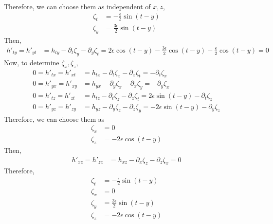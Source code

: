 \documentclass[12pt]{article}
\begin{document}
Therefore, we can choose them as independent of $x, z$,
\begin{align}
\zeta_{t} &= - \frac{\epsilon}{2} \sin\left(t - y\right) \\
\zeta_{y} &= \frac{3 \epsilon}{2} \sin\left(t - y\right)
\end{align}
Then,
\begin{align}
h'_{t y} = h'_{y t} &= h_{ty} - \partial_{t} \zeta_{y} - \partial_{y} \zeta_{t} = 2 \epsilon \cos\left(t - y\right) - \frac{3 \epsilon}{2} \cos\left(t - y\right) - \frac{\epsilon}{2} \cos\left(t - y\right) = 0
\end{align}
Now, to determine $\zeta_{x}, \zeta_{z}$,
\begin{align}
0 = h'_{t x} = h'_{x t} &= h_{tx} - \partial_{t} \zeta_{x} - \partial_{x} \zeta_{t} = - \partial_{t} \zeta_{x} \\
0 = h'_{y x} = h'_{x y} &= h_{yx} - \partial_{y} \zeta_{x} - \partial_{x} \zeta_{y} = - \partial_{y} \zeta_{x} \\
0 = h'_{t z} = h'_{z t} &= h_{tz} - \partial_{t} \zeta_{z} - \partial_{z} \zeta_{t} = 2 \epsilon \sin\left(t - y\right) - \partial_{t} \zeta_{z} \\
0 = h'_{y z} = h'_{z y} &= h_{yz} - \partial_{y} \zeta_{z} - \partial_{z} \zeta_{y} = - 2 \epsilon \sin\left(t - y\right) - \partial_{y} \zeta_{z}
\end{align}
Therefore, we can choose them as
\begin{align}
\zeta_{x} &= 0\\
\zeta_{z} &= - 2 \epsilon \cos\left(t - y\right)
\end{align}
Then,
\begin{align}
h'_{x z} = h'_{z x} &= h_{xz} - \partial_{x} \zeta_{z} - \partial_{z} \zeta_{x} = 0
\end{align}
Therefore,
\begin{align}
\zeta_{t} &= - \frac{\epsilon}{2} \sin\left(t - y\right) \\
\zeta_{x} &= 0\\
\zeta_{y} &= \frac{3 \epsilon}{2} \sin\left(t - y\right) \\
\zeta_{z} &= - 2 \epsilon \cos\left(t - y\right)
\end{align}
\end{document}
